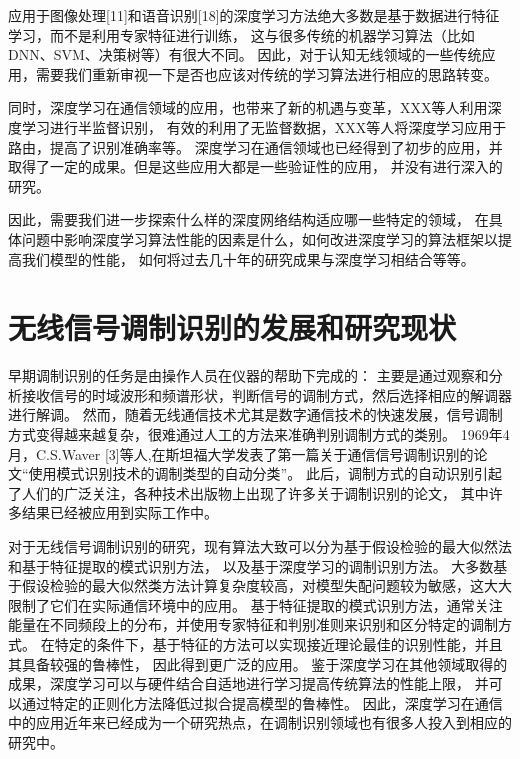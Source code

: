 应用于图像处理[11]和语音识别[18]的深度学习方法绝大多数是基于数据进行特征学习，而不是利用专家特征进行训练，
这与很多传统的机器学习算法（比如DNN、SVM、决策树等）有很大不同。
因此，对于认知无线领域的一些传统应用，需要我们重新审视一下是否也应该对传统的学习算法进行相应的思路转变。\par

同时，深度学习在通信领域的应用，也带来了新的机遇与变革，XXX等人利用深度学习进行半监督识别，
有效的利用了无监督数据，XXX等人将深度学习应用于路由，提高了识别准确率等。
深度学习在通信领域也已经得到了初步的应用，并取得了一定的成果。但是这些应用大都是一些验证性的应用，
并没有进行深入的研究。\par

因此，需要我们进一步探索什么样的深度网络结构适应哪一些特定的领域，
在具体问题中影响深度学习算法性能的因素是什么，如何改进深度学习的算法框架以提高我们模型的性能，
如何将过去几十年的研究成果与深度学习相结合等等。\par

\section{无线信号调制识别的发展和研究现状}

早期调制识别的任务是由操作人员在仪器的帮助下完成的：
主要是通过观察和分析接收信号的时域波形和频谱形状，判断信号的调制方式，然后选择相应的解调器进行解调。
然而，随着无线通信技术尤其是数字通信技术的快速发展，信号调制方式变得越来越复杂，很难通过人工的方法来准确判别调制方式的类别。 
1969年4月，C.S.Waver [3]等人,在斯坦福大学发表了第一篇关于通信信号调制识别的论文“使用模式识别技术的调制类型的自动分类”。
此后，调制方式的自动识别引起了人们的广泛关注，各种技术出版物上出现了许多关于调制识别的论文，
其中许多结果已经被应用到实际工作中。 \par

对于无线信号调制识别的研究，现有算法大致可以分为基于假设检验的最大似然法和基于特征提取的模式识别方法，
以及基于深度学习的调制识别方法。
大多数基于假设检验的最大似然类方法计算复杂度较高，对模型失配问题较为敏感，这大大限制了它们在实际通信环境中的应用。
基于特征提取的模式识别方法，通常关注能量在不同频段上的分布，并使用专家特征和判别准则来识别和区分特定的调制方式。
在特定的条件下，基于特征的方法可以实现接近理论最佳的识别性能，并且其具备较强的鲁棒性，
因此得到更广泛的应用。
鉴于深度学习在其他领域取得的成果，深度学习可以与硬件结合自适地进行学习提高传统算法的性能上限，
并可以通过特定的正则化方法降低过拟合提高模型的鲁棒性。
因此，深度学习在通信中的应用近年来已经成为一个研究热点，在调制识别领域也有很多人投入到相应的研究中。\par

